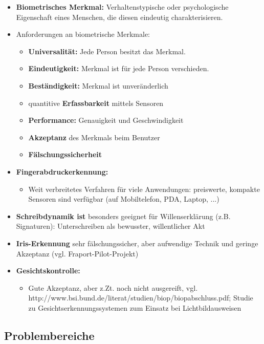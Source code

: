 \documentclass[openany]{book}
\begin{document}
\begin{itemize}
    \item \textbf{Biometrisches Merkmal:} Verhaltenstypische oder psychologische Eigenschaft eines Menschen, die diesen eindeutig charakterisieren.
    \item Anforderungen an biometrische Merkmale:
    \begin{itemize}
        \item \textbf{Universalität:} Jede Person besitzt das Merkmal.
        \item \textbf{Eindeutigkeit:} Merkmal ist für jede Person verschieden.
        \item \textbf{Beständigkeit:} Merkmal ist unveränderlich
        \item quantitive \textbf{Erfassbarkeit} mittels Sensoren
        \item \textbf{Performance:} Genauigkeit und Geschwindigkeit
        \item \textbf{Akzeptanz} des Merkmals beim Benutzer
        \item \textbf{Fälschungssicherheit} 
    \end{itemize}
    \item \textbf{Fingerabdruckerkennung:}
    \begin{itemize}
        \item Weit verbreitetes Verfahren für viele Anwendungen: preiswerte, kompakte Sensoren sind verfügbar (auf Mobiltelefon, PDA, Laptop, ...)
    \end{itemize}
    \item \textbf{Schreibdynamik ist} besonders geeignet für Willenserklärung (z.B. Signaturen): Unterschreiben als bewusster, willentlicher Akt
    \item \textbf{Iris-Erkennung} sehr fälschungssicher, aber aufwendige Technik und geringe Akzeptanz (vgl. Fraport-Pilot-Projekt)
    \item \textbf{Gesichtskontrolle:}
    \begin{itemize}
        \item Gute Akzeptanz, aber z.Zt. noch nicht ausgereift, vgl. \\ http://www.bsi.bund.de/literat/studien/biop/biopabschluss.pdf; Studie zu Gesichtserkennungssystemen zum Einsatz bei Lichtbildausweisen
    \end{itemize}
\end{itemize}

\subsection{Problembereiche}
\end{document}
